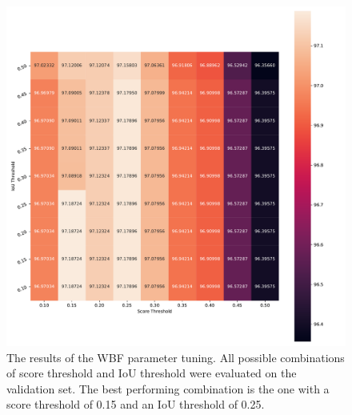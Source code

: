 \begin{figure}
\begin{center}
    \includegraphics[width=\columnwidth]{imgs/yolo_wbf_heat.pdf}
    \caption{The results of the \ac{WBF} parameter tuning. All possible combinations of score threshold and \ac{IoU} threshold were evaluated on the validation set. The best performing combination is the one with a score threshold of 0.15 and an \ac{IoU} threshold of 0.25.}
    \label{fig:wbf_nms_tuning}
\end{center}
\end{figure}

